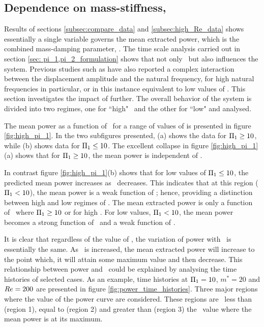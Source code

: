 \subsection{Dependence on mass-stiffness, \massstiff}
\label{subsec:dependence pi_1}



Results of sections \ref{subsec:compare_data} and \ref{subsec:high_Re_data} shows essentially a single variable governs the mean extracted power, which is the combined mass-damping parameter, \massdamp. The time scale analysis carried out in  section \ref{sec: pi_1,pi_2_formulation} shows that not only \massdamp \ but also \massstiff influences the system. Previous studies such as \cite{bouclin:77} have also reported a complex interaction between the displacement amplitude and the natural frequency, for high natural frequencies in particular, or in this instance equivalent to low values of \massstiff.  This section investigates the impact of \massstiff further. The overall behavior of the system is divided into two regimes, one for ``high" \massstiff \ and the other for ``low" \massstiff and analysed.

The mean power as a function of \massdamp \ for a range of values of \massstiff is presented in figure \ref{fig:high_pi_1}. In the two subfigures presented, (a) shows the data for $\Pi_1 \geq 10$, while (b) shows data for $\Pi_1 \leq 10$.  The excellent collapse in figure \ref{fig:high_pi_1}(a) shows that for $\Pi_1 \geq 10$, the mean power is independent of \massstiff.

In contrast figure \ref{fig:high_pi_1}(b) shows that for low values of $\Pi_1 \leq 10$, the predicted mean power increases as \massdamp \ decreases. This indicates that at this region ($\Pi_1 < 10$), the mean power is a weak function of \massstiff; hence, providing a distinction between high and low regimes of \massstiff. The mean extracted power is only a function of \massdamp \ where $\Pi_1 \geq 10$ or for high \massstiff. For low values, $\Pi_1 < 10$, the mean power becomes a strong function of \massdamp \ and a weak function of \massstiff.

It is clear that regardless of the value of \massstiff, the variation of power with \massdamp \ is essentially the same. As \massdamp \ is increased, the mean extracted power will increase to the point which, it will attain some maximum value and then decrease. This relationship between power and \massdamp \ could be explained by analysing the time histories of selected cases. 
As an example, time histories at $\Pi_1=10$, $m^*=20$ and $Re=200$ are presented in figure \ref{fig:power_time_histories}. Three major regions where the value of the power curve are considered. These regions are \massdamp\ less than (region 1), equal to (region 2) and greater than (region 3) the \massdamp\ value where the mean power is at its maximum.

